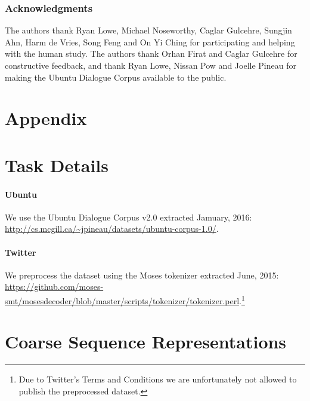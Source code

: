 \documentclass{article}
\begin{document}
\subsubsection*{Acknowledgments}

The authors thank Ryan Lowe, Michael Noseworthy, Caglar Gulcehre, Sungjin Ahn, Harm de Vries, Song Feng and On Yi Ching for participating and helping with the human study.
The authors thank Orhan Firat and Caglar Gulcehre for constructive feedback, and thank Ryan Lowe, Nissan Pow and Joelle Pineau for making the Ubuntu Dialogue Corpus available to the public.





\begingroup
    \vspace{-2.0mm}
    \footnotesize
    \setlength{\bibsep}{3pt}
    
\endgroup

\small
\newpage
\section*{Appendix}
\section{Task Details} \label{app:task_details}

\paragraph{Ubuntu} We use the Ubuntu Dialogue Corpus v2.0 extracted Jamuary, 2016: \url{http://cs.mcgill.ca/~jpineau/datasets/ubuntu-corpus-1.0/}.

\paragraph{Twitter} We preprocess the dataset using the Moses tokenizer extracted June, 2015: \url{https://github.com/moses-smt/mosesdecoder/blob/master/scripts/tokenizer/tokenizer.perl}.\footnote{Due to Twitter's Terms and Conditions we are unfortunately not allowed to publish the preprocessed dataset.}

\section{Coarse Sequence Representations} \label{app:coarse_seq_rep}
\end{document}
